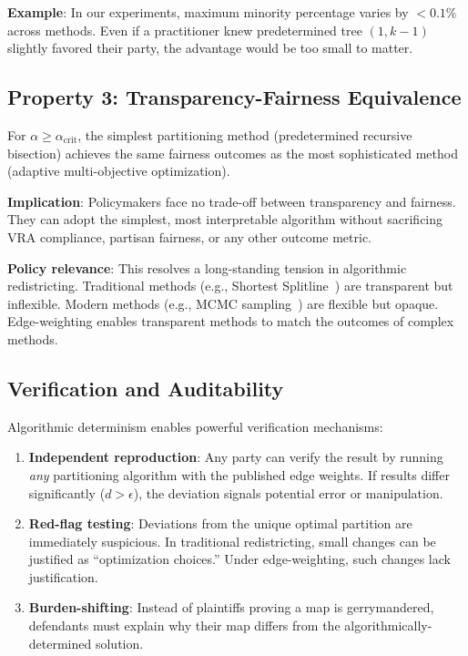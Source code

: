 \textbf{Example}: In our experiments, maximum minority percentage varies by $< 0.1\%$ across methods. Even if a practitioner knew predetermined tree $(1, k-1)$ slightly favored their party, the advantage would be too small to matter.

\subsection{Property 3: Transparency-Fairness Equivalence}

\begin{property}
\label{prop:transparency-fairness-supp}
For $\alpha \geq \alpha_{\text{crit}}$, the simplest partitioning method (predetermined recursive bisection) achieves the same fairness outcomes as the most sophisticated method (adaptive multi-objective optimization).
\end{property}

\textbf{Implication}: Policymakers face no trade-off between transparency and fairness. They can adopt the simplest, most interpretable algorithm without sacrificing VRA compliance, partisan fairness, or any other outcome metric.

\textbf{Policy relevance}: This resolves a long-standing tension in algorithmic redistricting. Traditional methods (e.g., Shortest Splitline~\cite{splitline}) are transparent but inflexible. Modern methods (e.g., MCMC sampling~\cite{duchin2018gerrymandering}) are flexible but opaque. Edge-weighting enables transparent methods to match the outcomes of complex methods.

\subsection{Verification and Auditability}

Algorithmic determinism enables powerful verification mechanisms:

\begin{enumerate}
    \item \textbf{Independent reproduction}: Any party can verify the result by running \textit{any} partitioning algorithm with the published edge weights. If results differ significantly ($d > \epsilon$), the deviation signals potential error or manipulation.

    \item \textbf{Red-flag testing}: Deviations from the unique optimal partition are immediately suspicious. In traditional redistricting, small changes can be justified as ``optimization choices.'' Under edge-weighting, such changes lack justification.

    \item \textbf{Burden-shifting}: Instead of plaintiffs proving a map is gerrymandered, defendants must explain why their map differs from the algorithmically-determined solution.
\end{enumerate}


